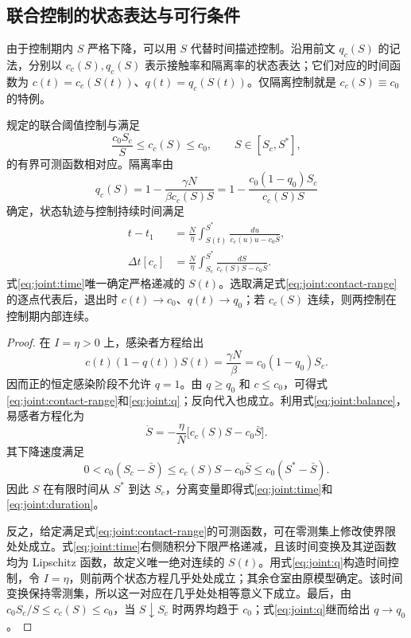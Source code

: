 \documentclass[lang=cn,a4paper,newtx]{elegantpaper}
\numberwithin{equation}{section}
\theoremstyle{plain}
\begin{document}
\subsection{联合控制的状态表达与可行条件}
由于控制期内 $S$ 严格下降，可以用 $S$ 代替时间描述控制。沿用前文 $q_c(S)$ 的记法，分别以 $c_c(S),q_c(S)$ 表示接触率和隔离率的状态表达；它们对应的时间函数为 $c(t)=c_c(S(t))$、$q(t)=q_c(S(t))$。仅隔离控制就是 $c_c(S)\equiv c_0$ 的特例。
\begin{theorem}
\label{thm:joint:representation}
规定的联合阈值控制与满足
\begin{equation}
\frac{c_0S_c}{S}\le c_c(S)\le c_0,\qquad S\in[S_c,S^*],
\label{eq:joint:contact-range}
\end{equation}
的有界可测函数相对应。隔离率由
\begin{equation}
q_c(S)=1-\frac{\gamma N}{\beta c_c(S)S}
      =1-\frac{c_0(1-q_0)S_c}{c_c(S)S}
\label{eq:joint:q}
\end{equation}
确定，状态轨迹与控制持续时间满足
\begin{align}
t-t_1&=\frac{N}{\eta}\int_{S(t)}^{S^*}
\frac{du}{c_c(u)u-c_0\bar S},\label{eq:joint:time}\\
\Delta t[c_c]&=\frac{N}{\eta}\int_{S_c}^{S^*}
\frac{dS}{c_c(S)S-c_0\bar S}.\label{eq:joint:duration}
\end{align}
式\eqref{eq:joint:time}唯一确定严格递减的 $S(t)$。选取满足式\eqref{eq:joint:contact-range}的逐点代表后，退出时 $c(t)\to c_0$、$q(t)\to q_0$；若 $c_c(S)$ 连续，则两控制在控制期内部连续。
\end{theorem}
\begin{proof}
在 $I=\eta>0$ 上，感染者方程给出
\begin{equation}
c(t)(1-q(t))S(t)=\frac{\gamma N}{\beta}
=c_0(1-q_0)S_c.
\label{eq:joint:balance}
\end{equation}
因而正的恒定感染阶段不允许 $q=1$。由 $q\ge q_0$ 和 $c\le c_0$，可得式\eqref{eq:joint:contact-range}和\eqref{eq:joint:q}；反向代入也成立。利用式\eqref{eq:joint:balance}，易感者方程化为
\begin{equation}
\dot S=-\frac{\eta}{N}\bigl[c_c(S)S-c_0\bar S\bigr].
\label{eq:joint:Sdot}
\end{equation}
其下降速度满足
\[
0<c_0(S_c-\bar S)\le c_c(S)S-c_0\bar S
\le c_0(S^*-\bar S).
\]
因此 $S$ 在有限时间从 $S^*$ 到达 $S_c$，分离变量即得式\eqref{eq:joint:time}和\eqref{eq:joint:duration}。

反之，给定满足式\eqref{eq:joint:contact-range}的可测函数，可在零测集上修改使界限处处成立。式\eqref{eq:joint:time}右侧随积分下限严格递减，且该时间变换及其逆函数均为 Lipschitz 函数，故定义唯一绝对连续的 $S(t)$。用式\eqref{eq:joint:q}构造时间控制，令 $I=\eta$，则前两个状态方程几乎处处成立；其余仓室由原模型确定。该时间变换保持零测集，所以这一对应在几乎处处相等意义下成立。最后，由 $c_0S_c/S\le c_c(S)\le c_0$，当 $S\downarrow S_c$ 时两界均趋于 $c_0$；式\eqref{eq:joint:q}继而给出 $q\to q_0$。
\end{proof}
\end{document}
